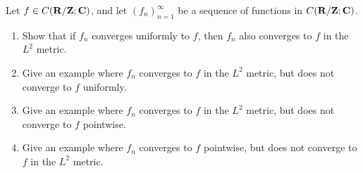 \begin{exercise}\label{ex 5.2.6}
    Let \(f \in C(\mathbf{R} / \mathbf{Z} ; \mathbf{C})\), and let \((f_n)_{n = 1}^\infty\) be a sequence of functions in \(C(\mathbf{R} / \mathbf{Z} ; \mathbf{C})\).
    \begin{enumerate}
        \item Show that if \(f_n\) converges uniformly to \(f\), then \(f_n\) also converges to \(f\) in the \(L^2\) metric.
        \item Give an example where \(f_n\) converges to \(f\) in the \(L^2\) metric, but does not converge to \(f\) uniformly.
        \item Give an example where \(f_n\) converges to \(f\) in the \(L^2\) metric, but does not converge to \(f\) pointwise.
        \item Give an example where \(f_n\) converges to \(f\) pointwise, but does not converge to \(f\) in the \(L^2\) metric.
    \end{enumerate}
\end{exercise}

